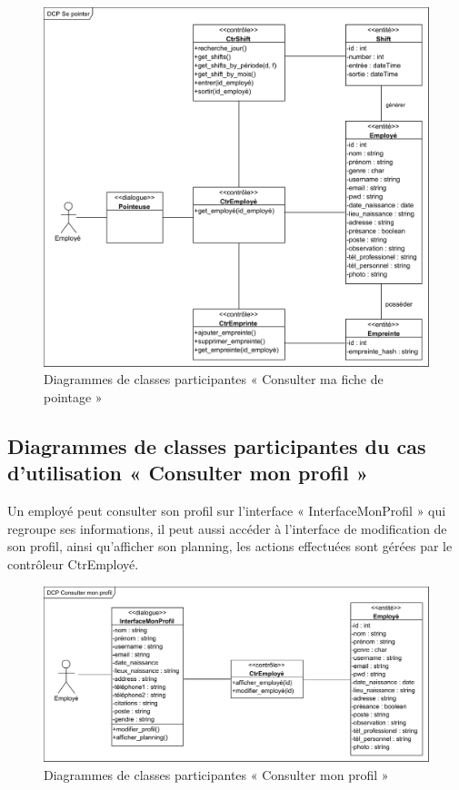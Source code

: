 \begin{figure}[h!]
    \centering
    \includegraphics[scale=0.84]{images/DCP/DCP Se pointer.png}
    \caption{Diagrammes de classes participantes « Consulter ma fiche de pointage »}
    \label{fig24}
\end{figure}
            
\subsection*{Diagrammes de classes participantes du cas d'utilisation « Consulter mon profil »}
Un employé peut consulter son profil sur l’interface « InterfaceMonProfil » qui 
regroupe ses informations, il peut aussi accéder à l’interface de modification 
de son profil, ainsi qu’afficher son planning, les actions effectuées sont 
gérées par le contrôleur CtrEmployé.  

\begin{figure}[h!]
    \centering
    \includegraphics[scale=0.7]{images/DCP/DCP consulter_mon_profil.png}
    \caption{Diagrammes de classes participantes « Consulter mon profil »}
    \label{fig25}
\end{figure}
        
